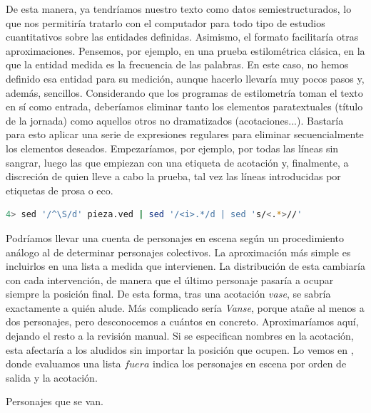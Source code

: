 De esta manera, ya tendríamos nuestro texto como datos semiestructurados, lo que nos permitiría tratarlo con el computador para todo tipo de estudios cuantitativos sobre las entidades definidas. Asimismo, el formato facilitaría otras aproximaciones. Pensemos, por ejemplo, en una prueba estilométrica clásica, en la que la entidad medida es la frecuencia de las palabras. En este caso, no hemos definido esa entidad para su medición, aunque hacerlo llevaría muy pocos pasos y, además, sencillos. Considerando que los programas de estilometría toman el texto en sí como entrada, deberíamos eliminar tanto los elementos paratextuales (título de la jornada) como aquellos otros no dramatizados (acotaciones...). Bastaría para esto aplicar una serie de expresiones regulares para eliminar secuencialmente los elementos deseados. Empezaríamos, por ejemplo, por todas las líneas sin sangrar, luego las que empiezan con una etiqueta de acotación y, finalmente, a discreción de quien lleve a cabo la prueba, tal vez las líneas introducidas por etiquetas de prosa o eco.

\begin{lstlisting}[frame=none,numbers=none,caption={Preparación de archivo VED para análisis estilométrico.},language=bash, label={extendedchars:sed}]
	4> sed '/^\S/d' pieza.ved | sed '/<i>.*/d | sed 's/<.*>//'	 
\end{lstlisting}

Podríamos llevar una cuenta de personajes en escena según un procedimiento análogo al de determinar personajes colectivos. La aproximación más simple es incluirlos en una lista a medida que intervienen. La distribución de esta cambiaría con cada intervención, de manera que el último personaje pasaría a ocupar siempre la posición final. De esta forma, tras una acotación \textit{vase}, se sabría exactamente a quién alude. Más complicado sería \textit{Vanse}, porque atañe al menos a dos personajes, pero desconocemos a cuántos en concreto. Aproximaríamos aquí, dejando el resto a la revisión manual. Si se especifican nombres en la acotación, esta afectaría a los aludidos sin importar la posición que ocupen.  Lo vemos en , donde evaluamos una lista $fuera$ indica los personajes en escena por orden de salida y la acotación. 

\begin{algorithm}[!ht]
	\caption{Personajes que se van.}\label{list:vanse}
\end{algorithm}

